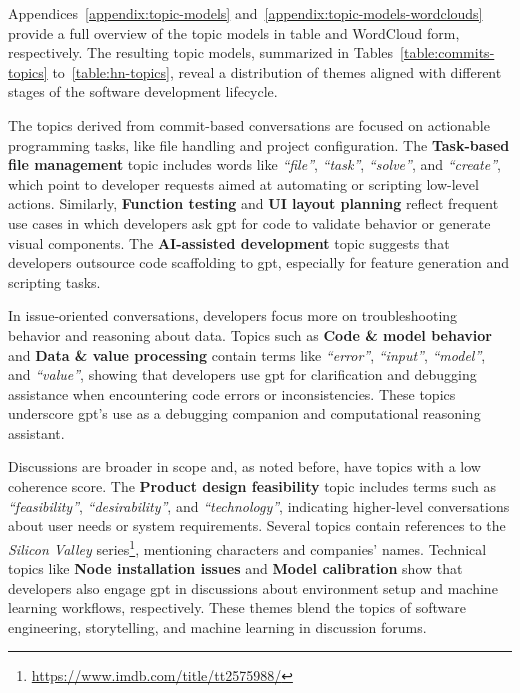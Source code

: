 Appendices~\ref{appendix:topic-models} and~\ref{appendix:topic-models-wordclouds} provide a full overview of the topic models in table and WordCloud form, respectively. The resulting topic models, summarized in Tables~\ref{table:commits-topics} to~\ref{table:hn-topics}, reveal a distribution of themes aligned with different stages of the software development lifecycle.

The topics derived from commit-based conversations are focused on actionable programming tasks, like file handling and project configuration. The \textbf{Task-based file management} topic includes words like \textit{``file''}, \textit{``task''}, \textit{``solve''}, and \textit{``create''}, which point to developer requests aimed at automating or scripting low-level actions. Similarly, \textbf{Function testing} and \textbf{UI layout planning} reflect frequent use cases in which developers ask \acrshort{gpt} for code to validate behavior or generate visual components. The \textbf{AI-assisted development} topic suggests that developers outsource code scaffolding to \acrshort{gpt}, especially for feature generation and scripting tasks.

In issue-oriented conversations, developers focus more on troubleshooting behavior and reasoning about data. Topics such as \textbf{Code \& model behavior} and \textbf{Data \& value processing} contain terms like \textit{``error''}, \textit{``input''}, \textit{``model''}, and \textit{``value''}, showing that developers use \acrshort{gpt} for clarification and debugging assistance when encountering code errors or inconsistencies. These topics underscore \acrshort{gpt}'s use as a debugging companion and computational reasoning assistant.

Discussions are broader in scope and, as noted before, have topics with a low coherence score. The \textbf{Product design feasibility} topic includes terms such as \textit{``feasibility''}, \textit{``desirability''}, and \textit{``technology''}, indicating higher-level conversations about user needs or system requirements. Several topics contain references to the \textit{Silicon Valley} series\footnote{\url{https://www.imdb.com/title/tt2575988/}}, mentioning characters and companies' names. Technical topics like \textbf{Node installation issues} and \textbf{Model calibration} show that developers also engage \acrshort{gpt} in discussions about environment setup and machine learning workflows, respectively. These themes blend the topics of software engineering, storytelling, and machine learning in discussion forums.

